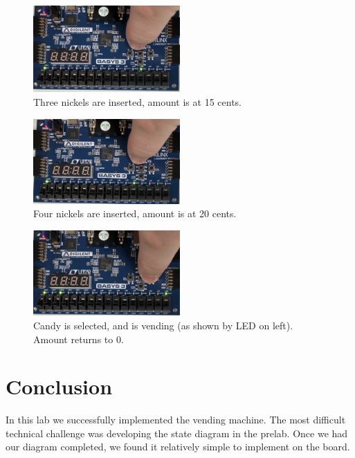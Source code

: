 \documentclass[11pt]{article}
\begin{document}
\begin{figure}[H]
\begin{center}
	\includegraphics[width=0.5\textwidth]{./images/lab10img7.jpg}
	\caption{\label{fig:lab10_img7}Three nickels are inserted, amount is at 15 cents.}
\end{center}
\end{figure}

\begin{figure}[H]
\begin{center}
	\includegraphics[width=0.5\textwidth]{./images/lab10img8.jpg}
	\caption{\label{fig:lab10_img8}Four nickels are inserted, amount is at 20 cents.}
\end{center}
\end{figure}

\begin{figure}[H]
\begin{center}
	\includegraphics[width=0.5\textwidth]{./images/lab10img9.jpg}
	\caption{\label{fig:lab10_img9}Candy is selected, and is vending (as shown by LED on left). Amount returns to 0.}
\end{center}
\end{figure}

\section{Conclusion}
In this lab we successfully implemented the vending machine. The most difficult technical challenge was developing the state diagram in the prelab. Once we had our diagram completed, we found it relatively simple to implement on the board.
\end{document}
